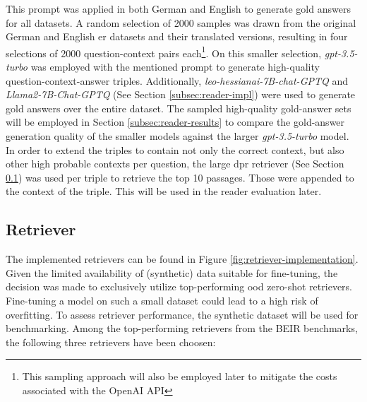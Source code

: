 This prompt was applied in both German and English to generate gold answers for all datasets. A random selection of 2000 samples was drawn from the original German and English \gls{er} datasets and their translated versions, resulting in four selections of 2000 question-context pairs each\footnote{This sampling approach will also be employed later to mitigate the costs associated with the OpenAI API}. On this smaller selection, \textit{gpt-3.5-turbo} was employed with the mentioned prompt to generate high-quality question-context-answer triples. Additionally, \textit{leo-hessianai-7B-chat-GPTQ} and \textit{Llama2-7B-Chat-GPTQ} (See Section \ref{subsec:reader-impl}) were used to generate gold answers over the entire dataset. The sampled high-quality gold-answer sets will be employed in Section \ref{subsec:reader-results} to compare the gold-answer generation quality of the smaller models against the larger \textit{gpt-3.5-turbo} model. In order to extend the triples to contain not only the correct context, but also other high probable contexts per question, the large \gls{dpr} retriever (See Section \ref{subsec:retriever-impl}) was used per triple to retrieve the top 10 passages. Those were appended to the context of the triple. This will be used in the reader evaluation later.

\subsection{Retriever}
\label{subsec:retriever-impl}

The implemented retrievers can be found in Figure \ref{fig:retriever-implementation}. Given the limited availability of (synthetic) data suitable for fine-tuning, the decision was made to exclusively utilize top-performing \gls{ood} zero-shot retrievers. Fine-tuning a model on such a small dataset could lead to a high risk of overfitting. To assess retriever performance, the synthetic dataset will be used for benchmarking. Among the top-performing retrievers from the BEIR benchmarks, the following three retrievers have been choosen:

